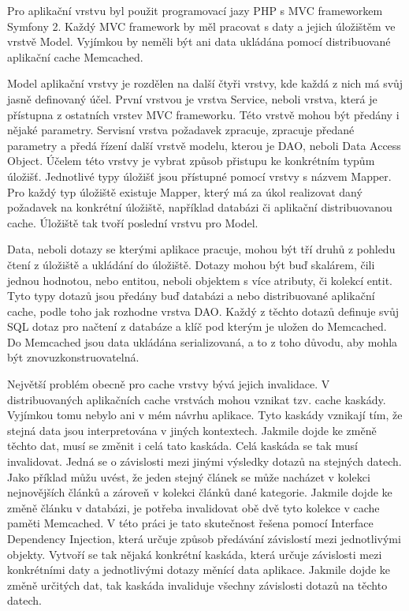 \documentclass[12pt]{article}
\begin{document}
\label{sec:app-model-memcached}
Pro aplikační vrstvu byl použit programovací jazy PHP s MVC frameworkem Symfony 2. Každý MVC framework by měl pracovat s daty a jejich úložištěm ve vrstvě Model. Vyjímkou by neměli být ani data ukládána pomocí distribuované aplikační cache Memcached.

Model aplikační vrstvy je rozdělen na další čtyři vrstvy, kde každá z nich má svůj jasně definovaný účel. První vrstvou je vrstva Service, neboli vrstva, která je přístupna z ostatních vrstev MVC frameworku. Této vrstvě mohou být předány i nějaké parametry. Servisní vrstva požadavek zpracuje, zpracuje předané parametry a předá řízení další vrstvě modelu, kterou je DAO, neboli Data Access Object. Účelem této vrstvy je vybrat způsob přistupu ke konkrétním typům úložišť. Jednotlivé typy úložišť jsou přístupné pomocí vrstvy s názvem Mapper. Pro každý typ úložiště existuje Mapper, který má za úkol realizovat daný požadavek na konkrétní úložiště, například databázi či aplikační distribuovanou cache. Úložiště tak tvoří poslední vrstvu pro Model.

Data, neboli dotazy se kterými aplikace pracuje, mohou být tří druhů z pohledu čtení z úložiště a ukládání do úložiště. Dotazy mohou být buď skalárem, čili jednou hodnotou, nebo entitou, neboli objektem s více atributy, či kolekcí entit. Tyto typy dotazů jsou předány buď databázi a nebo distribuované aplikační cache, podle toho jak rozhodne vrstva DAO. Každý z těchto dotazů definuje svůj SQL dotaz pro načtení z databáze a klíč pod kterým je uložen do Memcached. Do Memcached jsou data ukládána serializovaná, a to z toho důvodu, aby mohla být znovuzkonstruovatelná.

Největší problém obecně pro cache vrstvy bývá jejich invalidace. V distribuovaných aplikačních cache vrstvách mohou vznikat tzv. cache kaskády. Vyjímkou tomu nebylo ani v mém návrhu aplikace. Tyto kaskády vznikají tím, že stejná data jsou interpretována v jiných kontextech. Jakmile dojde ke změně těchto dat, musí se změnit i celá tato kaskáda. Celá kaskáda se tak musí invalidovat. Jedná se o závislosti mezi jinými výsledky dotazů na stejných datech. Jako příklad můžu uvést, že jeden stejný článek se může nacházet v kolekci nejnovějších článků a zároveň v kolekci článků dané kategorie. Jakmile dojde ke změně článku v databázi, je potřeba invalidovat obě dvě tyto kolekce v cache paměti Memcached. V této práci je tato skutečnost řešena pomocí Interface Dependency Injection, která určuje způsob předávání závislostí mezi jednotlivými objekty. Vytvoří se tak nějaká konkrétní kaskáda, která určuje závislosti mezi konkrétními daty a jednotlivými dotazy měnící data aplikace. Jakmile dojde ke změně určitých dat, tak kaskáda invaliduje všechny závislosti dotazů na těchto datech.
\end{document}
